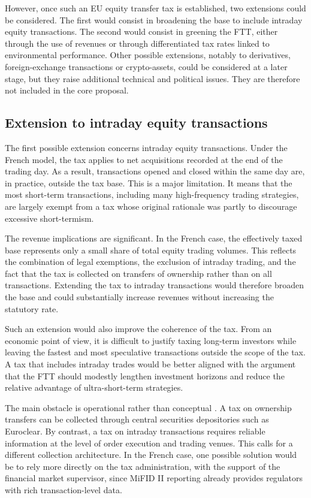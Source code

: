 \documentclass[../../main]{subfiles}
\begin{document}
However, once such an EU equity transfer tax is established, two extensions could be considered. The first would consist in broadening the base to include intraday equity transactions. The second would consist in greening the FTT, either through the use of revenues or through differentiated tax rates linked to environmental performance. Other possible extensions, notably to derivatives, foreign-exchange transactions or crypto-assets, could be considered at a later stage, but they raise additional technical and political issues. They are therefore not included in the core proposal.

\subsection{Extension to intraday equity transactions}

The first possible extension concerns intraday equity transactions. Under the French model, the tax applies to net acquisitions recorded at the end of the trading day. As a result, transactions opened and closed within the same day are, in practice, outside the tax base. This is a major limitation. It means that the most short-term transactions, including many high-frequency trading strategies, are largely exempt from a tax whose original rationale was partly to discourage excessive short-termism.

The revenue implications are significant. In the French case, the effectively taxed base represents only a small share of total equity trading volumes. This reflects the combination of legal exemptions, the exclusion of intraday trading, and the fact that the tax is collected on transfers of ownership rather than on all transactions. Extending the tax to intraday transactions would therefore broaden the base and could substantially increase revenues without increasing the statutory rate.

Such an extension would also improve the coherence of the tax. From an economic point of view, it is difficult to justify taxing long-term investors while leaving the fastest and most speculative transactions outside the scope of the tax. A tax that includes intraday trades would be better aligned with the argument that the FTT should modestly lengthen investment horizons and reduce the relative advantage of ultra-short-term strategies.

The main obstacle is operational rather than conceptual \citep{ CapelleBlancard2024FrenchFTT}. A tax on ownership transfers can be collected through central securities depositories such as Euroclear. By contrast, a tax on intraday transactions requires reliable information at the level of order execution and trading venues. This calls for a different collection architecture. In the French case, one possible solution would be to rely more directly on the tax administration, with the support of the financial market supervisor, since MiFID II reporting already provides regulators with rich transaction-level data.
\end{document}
